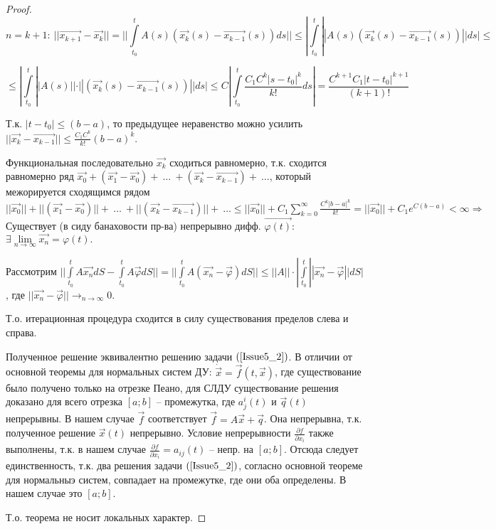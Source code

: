\begin{proof}
\[n = k + 1:\  ||\overrightarrow{x_{k+1}} - \overrightarrow{x_{k}}|| = || \int\limits_{t_0}^{t} A(s)(\overrightarrow{x_k}(s) - \overrightarrow{x_{k-1}}(s))ds || \leqslant | \int\limits_{t_0}^{t} ||A(s)(\overrightarrow{x_k}(s) - \overrightarrow{x_{k-1}}(s))|| ds | \leqslant \]

\[ \leqslant | \int\limits_{t_0}^{t} ||A(s)||\cdot ||(\overrightarrow{x_k}(s) - \overrightarrow{x_{k-1}}(s))|| ds | \leqslant C |\int\limits_{t_0}^{t} \frac{C_1C^k|s-t_0|^k}{k!}ds | = \frac{C^{k+1}C_1|t-t_0|^{k+1}}{(k+1)!} \]

Т.к. $|t-t_0| \leqslant (b-a)$, то предыдущее неравенство можно усилить $||\overrightarrow{x_k} - \overrightarrow{x_{k-1}}|| \leqslant \frac{C_1C^k}{k!}(b-a)^k.$

Функциональная последовательно $\overrightarrow{x_k}$ сходиться равномерно, т.к. сходится равномерно ряд $\overrightarrow{x_0} + (\overrightarrow{x_1} - \overrightarrow{x_0}) +\ \dots\ +(\overrightarrow{x_k} - \overrightarrow{x_{k-1}}) +\ \dots$, который межорируется сходящимся рядом $||\overrightarrow{x_0}|| + ||(\overrightarrow{x_1} - \overrightarrow{x_0})|| +\ \dots\ + ||(\overrightarrow{x_k} - \overrightarrow{x_{k-1}})|| +\ \dots \leqslant ||\overrightarrow{x_0}|| + C_1\sum\limits_{k = 0}^{\infty}\frac{C^k|b-a|^k}{k!} = ||\overrightarrow{x_0}|| + C_1 e^{C(b-a)} < \infty \Rightarrow$ Существует (в сиду банаховости пр-ва) непрерывно дифф. $\overrightarrow{\varphi(t)}:$ $\exists \lim\limits_{n \rightarrow \infty} \overrightarrow{x_n} = \varphi(t).$

Рассмотрим $|| \int\limits_{t_0}^{t} A\overrightarrow{x_n}dS - \int\limits_{t_0}^{t} A\overrightarrow{\varphi} dS || = || \int\limits_{t_0}^{t} A(\overrightarrow{x_n} - \overrightarrow{\varphi})dS || \leqslant ||A||\cdot | \int\limits_{t_0}^{t} ||\overrightarrow{x_n} - \overrightarrow{\varphi}|| dS | $, где $||\overrightarrow{x_n} - \overrightarrow{\varphi} || \rightarrow_{n\rightarrow \infty} 0.$

Т.о. итерационная процедура сходится в силу существования пределов слева и справа.

Полученное решение эквивалентно решению задачи $(\ref{Issue5_2})$. В отличии от основной теоремы для нормальных систем ДУ: $\dot{\overrightarrow{x}} = \overrightarrow{f}(t, \overrightarrow{x})$, где существование было получено только на отрезке Пеано, для СЛДУ существование решения доказано для всего отрезка $[a;b]$ -- промежутка, где $a_j^i(t)$ и $\overrightarrow{q}(t)$ непрерывны. В нашем случае $\overrightarrow{f}$ соответствует $\overrightarrow{f} = A\overrightarrow{x} + \overrightarrow{q}$. Она непрерывна, т.к. полученное решение $\overrightarrow{x}(t)$ непрерывно. Условие непрерывности $\frac{\partial f}{\partial x_i}$ также выполнены, т.к. в нашем случае $\frac{\partial f}{\partial x_i} = a_{ij}(t)$ -- непр. на $[a;b]$. Отсюда следует единственность, т.к. два решения задачи $(\ref{Issue5_2})$, согласно основной теореме для нормальныэ систем, совпадает на промежутке, где они оба определены. В нашем случае это $[a;b]$.

Т.о. теорема не носит локальных характер.

\end{proof}
